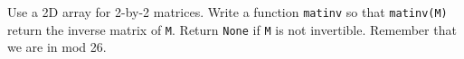   Use a 2D array for 2-by-2 matrices.
  Write a function \verb!matinv! so that
  \verb!matinv(M)!
  return the inverse matrix of \verb!M!.
  Return \verb!None! if \verb!M! is not invertible.
  Remember that we are in mod 26.
